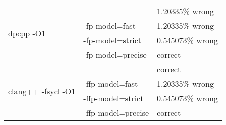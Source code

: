 \documentclass[../main]{subfiles}
\begin{document}
\begin{center}
	\begin{table}
		\centering
		\begin{tabular}{||ll|l||}
			\hline
			\multirow{4}{*}{dpcpp -O1}          & ---                & 1.20335\% wrong  \\
			                                    & -fp-model=fast     & 1.20335\% wrong  \\
			                                    & -fp-model=strict   & 0.545073\% wrong \\
			                                    & -fp-model=precise  & correct          \\ \hline \hline
			\multirow{4}{*}{clang++ -fsycl -O1} & ---                & correct          \\
			                                    & -ffp-model=fast    & 1.20335\% wrong  \\
			                                    & -ffp-model=strict  & 0.545073\% wrong \\
			                                    & -ffp-model=precise & correct          \\ \hline
		\end{tabular}
		\caption{\label{tab:semantics}}
	\end{table}
\end{center}
\end{document}
